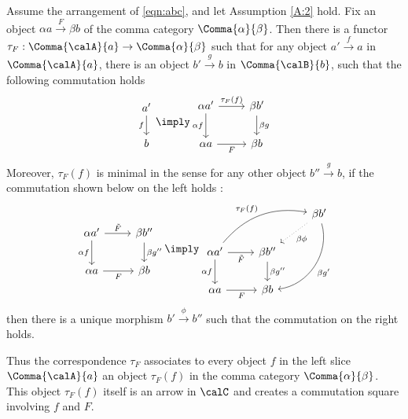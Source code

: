\documentclass[12pt,oneside]{article}
\begin{document}
\begin{theorem}  \label{thm:1}
	Assume the arrangement of \eqref{eqn:abc}, and let Assumption \ref{A:2} hold. Fix an object $\alpha a \xrightarrow{F} \beta b$ of the comma category $\Comma{\alpha}{\beta}$. Then there is a functor $\tau_{F} : \Comma{\calA}{a} \to \Comma{\alpha}{\beta}$ such that for any object $a'\xrightarrow{f} a$ in $\Comma{\calA}{a}$, there is an object $b'\xrightarrow{g} b$ in $\Comma{\calB}{b}$, such that the following commutation holds 
	\begin{equation} \label{eqn:thm:1a}
		\begin{tikzcd} a' \arrow[d, "f"'] \\ b \end{tikzcd}
		\imply
		\begin{tikzcd}
			\alpha a' \arrow[d, "\alpha f"'] \arrow[r, "\tau_{F}(f)"] & \beta b' \arrow[d, "\beta g"] \\
			\alpha a \arrow[r, "F"'] & \beta b 
		\end{tikzcd}
	\end{equation}
	Moreover, $\tau_{F}(f)$ is minimal in the sense for any other object $b'' \xrightarrow{g} b$, if the commutation shown below on the left holds :
	\[%
	\begin{tikzcd}
		\alpha a' \arrow[d, "\alpha f"'] \arrow[r, "\tilde{F}"] & \beta b'' \arrow[d, "\beta g''"] \\
		\alpha a \arrow[r, "F"'] & \beta b 
	\end{tikzcd} \imply 
	\begin{tikzcd}
		& & \beta b' \arrow[ldd, "\beta g'", bend left=50] \arrow[ld, "\beta \phi", dotted] \\
		\alpha a' \arrow[d, "\alpha f"'] \arrow[r, "\tilde{F}"'] \arrow[rru, "\tau_{F}(f)", bend left] & \beta b'' \arrow[d, "\beta g''"] & \\
		\alpha a \arrow[r, "F"'] & \beta b & 
	\end{tikzcd}
	\]%
	then there is a unique morphism $b' \xrightarrow{\phi} b''$ such that the commutation on the right holds.
\end{theorem}

Thus the correspondence $\tau_{F}$ associates to every object $f$ in the left slice $\Comma{\calA}{a}$ an object $\tau_{F}(f)$ in the comma category $\Comma{\alpha}{\beta}$. This object $\tau_{F}(f)$ itself is an arrow in $\calC$ and creates a commutation square involving $f$ and $F$.
\end{document}
